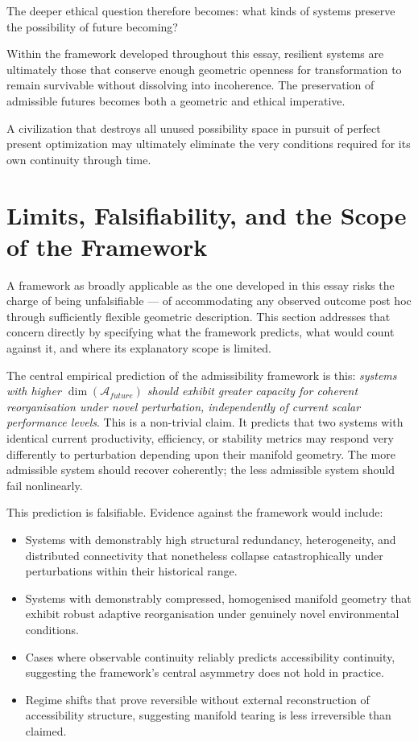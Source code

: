 \documentclass[11pt,a4paper]{article}
\newcommand{\Aspace}{\mathcal{A}}
\begin{document}
The deeper ethical question therefore becomes: what kinds of systems preserve the possibility of future becoming?

Within the framework developed throughout this essay, resilient systems are ultimately those that conserve enough geometric openness for transformation to remain survivable without dissolving into incoherence. The preservation of admissible futures becomes both a geometric and ethical imperative.

A civilization that destroys all unused possibility space in pursuit of perfect present optimization may ultimately eliminate the very conditions required for its own continuity through time.


\newpage

\section{Limits, Falsifiability, and the Scope of the Framework}

A framework as broadly applicable as the one developed in this essay risks the charge of being unfalsifiable --- of accommodating any observed outcome post hoc through sufficiently flexible geometric description. This section addresses that concern directly by specifying what the framework predicts, what would count against it, and where its explanatory scope is limited.

The central empirical prediction of the admissibility framework is this: \emph{systems with higher $\dim(\Aspace_{future})$ should exhibit greater capacity for coherent reorganisation under novel perturbation, independently of current scalar performance levels}. This is a non-trivial claim. It predicts that two systems with identical current productivity, efficiency, or stability metrics may respond very differently to perturbation depending upon their manifold geometry. The more admissible system should recover coherently; the less admissible system should fail nonlinearly.

This prediction is falsifiable. Evidence against the framework would include:
\begin{itemize}
  \item Systems with demonstrably high structural redundancy, heterogeneity, and distributed connectivity that nonetheless collapse catastrophically under perturbations within their historical range.
  \item Systems with demonstrably compressed, homogenised manifold geometry that exhibit robust adaptive reorganisation under genuinely novel environmental conditions.
  \item Cases where observable continuity reliably predicts accessibility continuity, suggesting the framework's central asymmetry does not hold in practice.
  \item Regime shifts that prove reversible without external reconstruction of accessibility structure, suggesting manifold tearing is less irreversible than claimed.
\end{itemize}
\end{document}

